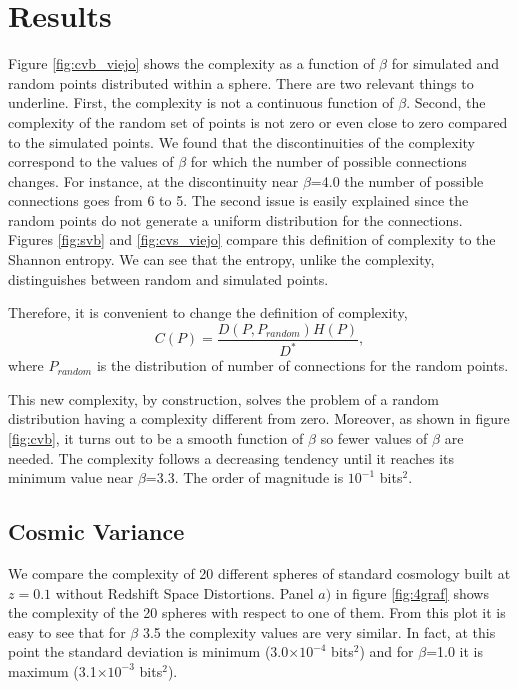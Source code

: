 \documentclass[fleqn,usenatbib]{mnras}
\begin{document}
\section{Results}
\label{sec:results}

Figure \ref{fig:cvb_viejo} shows the complexity as a function of
$\beta$ for simulated and random points distributed within a
sphere. There are two relevant things to underline. First, the
complexity is not a continuous function of $\beta$. Second, the
complexity of the random set of points is not zero or even close to
zero compared to the simulated points. We found that the
discontinuities of the complexity correspond to the values of $\beta$
for which the number of possible connections changes. For instance, at
the discontinuity near $\beta$=4.0 the number of possible connections
goes from 6 to 5. The second issue is easily explained since the
random points do not generate a uniform distribution for the
connections. Figures \ref{fig:svb} and \ref{fig:cvs_viejo} compare
this definition of complexity to the Shannon entropy. We can see that
the entropy, unlike the complexity, distinguishes between random and
simulated points.  

Therefore, it is convenient to change the definition of complexity, 
\begin{equation}
    C(P)=\frac{D(P,P_{random})H(P)}{D^{*}},
    \label{eq:comp_def2}
\end{equation}
where $P_{random}$ is the distribution of number of connections for
the random points. 

This new complexity, by construction, solves the problem of a random
distribution having a complexity different from zero. Moreover, as
shown in figure \ref{fig:cvb}, it turns out to be a smooth function of
$\beta$ so fewer values of $\beta$ are needed. The complexity follows
a decreasing tendency until it reaches its minimum value near
$\beta$=3.3. The order of magnitude is $10^{-1}$ bits$^{2}$. 

\subsection{Cosmic Variance}

We compare the complexity of 20 different spheres of standard
cosmology built at $z=0.1$ without Redshift Space Distortions. Panel
$a)$ in figure \ref{fig:4graf} shows the complexity of the 20 spheres
with respect to one of them. From this plot it is easy to see that for
$\beta$ 3.5 the complexity values are very similar. In fact, at this
point the standard deviation is minimum (3.0$\times10^{-4}$
bits$^{2}$) and for $\beta$=1.0 it is maximum (3.1$\times10^{-3}$
bits$^{2}$).  
\end{document}

